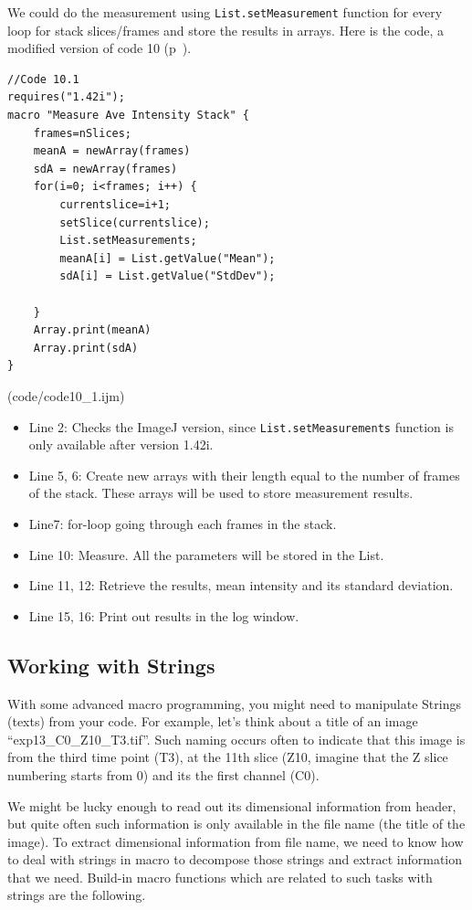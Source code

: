 \documentclass[11pt,a4paper,oneside]{report}
\newcommand{\ilcom}[1]{\texttt{\small#1}}
\begin{document}
We could do the measurement using \ilcom{List.setMeasurement} function for every loop for stack slices/frames and store the results in arrays. Here is the code, a modified version of code 10 (p~\pageref{code:10}). 


\begin{lstlisting}[morekeywords={*, List, setMeasurements, getValue, newArray}]
//Code 10.1
requires("1.42i");
macro "Measure Ave Intensity Stack" {
	frames=nSlices;
	meanA = newArray(frames)
	sdA = newArray(frames)
	for(i=0; i<frames; i++) {
		currentslice=i+1;
		setSlice(currentslice);
		List.setMeasurements;
		meanA[i] = List.getValue("Mean");
		sdA[i] = List.getValue("StdDev");
		
	}
	Array.print(meanA)
	Array.print(sdA)
}
\end{lstlisting}
(code/code10_1.ijm)

\begin{itemize}
  \item Line 2: Checks the ImageJ version, since \ilcom{List.setMeasurements} function is only available after version 1.42i.
  \item Line 5, 6: Create new arrays with their length equal to the number of frames of the stack. These arrays will be used to store measurement results. 
  \item Line7: for-loop going through each frames in the stack.
  \item Line 10: Measure. All the parameters will be stored in the List. 
  \item Line 11, 12: Retrieve the results, mean intensity and its standard deviation. 
  \item Line 15, 16: Print out results in the log window. 
\end{itemize}
   \subsection{Working with Strings}

With some advanced macro programming, you might need to manipulate Strings (texts) from your code. For example, let's think about a title of an image ``exp13\_C0\_Z10\_T3.tif''. Such naming occurs often to indicate that this image is from the third time point (T3), at the 11th slice (Z10, imagine that the Z slice numbering starts from 0) and its the first channel (C0). 

We might be lucky enough to read out its dimensional information from header, but quite often such information is only available in the file name (the title of the image). To extract dimensional information from file name, we need to know how to deal with strings in macro to decompose those strings and extract information that we need. Build-in macro functions which are related to such tasks with strings are the following. 
\end{document}
